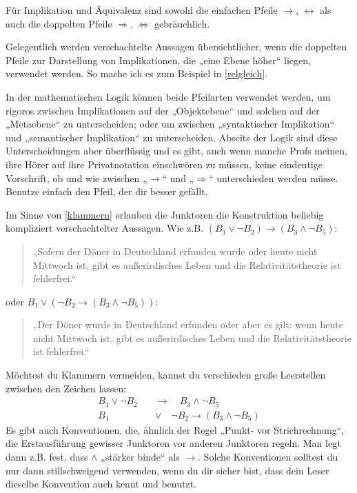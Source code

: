 	
\begin{bem}
    Für Implikation und Äquivalenz sind sowohl die einfachen Pfeile $\to$, $\leftrightarrow$ als auch die doppelten Pfeile $\Rightarrow$, $\Leftrightarrow$ gebräuchlich.
    
    Gelegentlich werden verschachtelte Aussagen übersichtlicher, wenn die doppelten Pfeile zur Darstellung von Implikationen, die „eine Ebene höher“ liegen, verwendet werden. So mache ich es zum Beispiel in \cref{relgleich}.
    
    In der mathematischen Logik können beide Pfeilarten verwendet werden, um rigoros zwischen Implikationen auf der „Objektebene“ und solchen auf der „Metaebene“ zu unterscheiden; oder um zwischen „syntaktischer Implikation“ und „semantischer Implikation“ zu unterscheiden. Abseits der Logik sind diese Unterscheidungen aber überflüssig und es gibt, auch wenn manche Profs meinen, ihre Hörer auf ihre Privatnotation einschwören zu müssen, keine eindeutige Vorschrift, ob und wie zwischen „$\to$“ und „$\Rightarrow$“ unterschieden werden müsse. Benutze einfach den Pfeil, der dir besser gefällt.
\end{bem}

	
\begin{bem}
    Im Sinne von \cref{klammern} erlauben die Junktoren die Konstruktion beliebig kompliziert verschachtelter Aussagen. Wie z.B. $(B_1\lor \neg B_2) \to (B_3\land \neg B_5)$:
    \begin{quote}
        „Sofern der Döner in Deutschland erfunden wurde oder heute nicht Mittwoch ist, gibt es außerirdisches Leben und die Relativitätstheorie ist fehlerfrei.“
    \end{quote}
    oder $B_1\lor (\neg B_2 \to (B_3\land \neg B_5))$:
    \begin{quote}
        „Der Döner wurde in Deutschland erfunden oder aber es gilt: wenn heute nicht Mittwoch ist, gibt es außerirdisches Leben und die Relativitätstheorie ist fehlerfrei.“
    \end{quote}
    Möchtest du Klammern vermeiden, kannst du verschieden große Leerstellen zwischen den Zeichen lassen:
    \begin{align*}
        B_1\lor \neg B_2\quad &\to \quad B_3\land \neg B_5 \\[0.5em]
        B_1\quad  &\lor \quad \neg B_2 \to (B_3\land \neg B_5)
    \end{align*}
    Es gibt auch Konventionen, die, ähnlich der Regel „Punkt- vor Strichrechnung“, die Erstausführung gewisser Junktoren vor anderen Junktoren regeln. Man legt dann z.B. fest, dass $\land$ „stärker binde“ als $\to$. Solche Konventionen solltest du nur dann stillschweigend verwenden, wenn du dir sicher bist, dass dein Leser dieselbe Konvention auch kennt und benutzt.
\end{bem}


